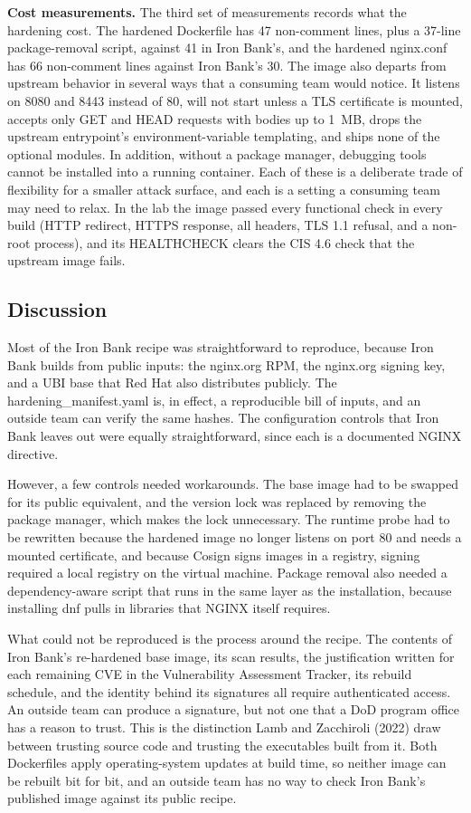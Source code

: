 \documentclass[10pt,letterpaper,twocolumn]{article}
\begin{document}
\textbf{Cost measurements.} The third set of measurements records what the hardening cost. The hardened Dockerfile has 47 non-comment lines, plus a 37-line package-removal script, against 41 in Iron Bank's, and the hardened nginx.conf has 66 non-comment lines against Iron Bank's 30. The image also departs from upstream behavior in several ways that a consuming team would notice. It listens on 8080 and 8443 instead of 80, will not start unless a TLS certificate is mounted, accepts only GET and HEAD requests with bodies up to 1~MB, drops the upstream entrypoint's environment-variable templating, and ships none of the optional modules. In addition, without a package manager, debugging tools cannot be installed into a running container. Each of these is a deliberate trade of flexibility for a smaller attack surface, and each is a setting a consuming team may need to relax. In the lab the image passed every functional check in every build (HTTP redirect, HTTPS response, all headers, TLS 1.1 refusal, and a non-root process), and its HEALTHCHECK clears the CIS 4.6 check that the upstream image fails.

\subsection{Discussion}

Most of the Iron Bank recipe was straightforward to reproduce, because Iron Bank builds from public inputs: the nginx.org RPM, the nginx.org signing key, and a UBI base that Red Hat also distributes publicly. The hardening\_manifest.yaml is, in effect, a reproducible bill of inputs, and an outside team can verify the same hashes. The configuration controls that Iron Bank leaves out were equally straightforward, since each is a documented NGINX directive.

However, a few controls needed workarounds. The base image had to be swapped for its public equivalent, and the version lock was replaced by removing the package manager, which makes the lock unnecessary. The runtime probe had to be rewritten because the hardened image no longer listens on port 80 and needs a mounted certificate, and because Cosign signs images in a registry, signing required a local registry on the virtual machine. Package removal also needed a dependency-aware script that runs in the same layer as the installation, because installing dnf pulls in libraries that NGINX itself requires.

What could not be reproduced is the process around the recipe. The contents of Iron Bank's re-hardened base image, its scan results, the justification written for each remaining CVE in the Vulnerability Assessment Tracker, its rebuild schedule, and the identity behind its signatures all require authenticated access. An outside team can produce a signature, but not one that a DoD program office has a reason to trust. This is the distinction Lamb and Zacchiroli (2022) draw between trusting source code and trusting the executables built from it. Both Dockerfiles apply operating-system updates at build time, so neither image can be rebuilt bit for bit, and an outside team has no way to check Iron Bank's published image against its public recipe.
\end{document}
